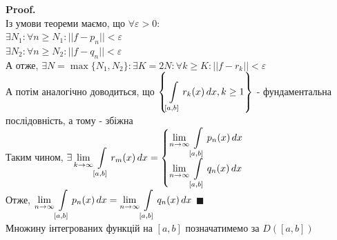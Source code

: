 \documentclass[a4paper, 14pt]{extarticle}
\def\huge{\displaystyle}
\def\bigline{\vspace{5mm}\\}
\theoremstyle{theoremdd}
\theoremstyle{theoremdd}
\theoremstyle{theoremdd}
\theoremstyle{theoremdd}
\theoremstyle{theoremdd}
\theoremstyle{theoremdd}
\theoremstyle{theoremdd}
\theoremstyle{theoremdd}
\newenvironment{pf}{\vspace*{-3mm} \textbf{Proof. \\}}{$\blacksquare$}
\begin{document}
\begin{pf}
Із умови теореми маємо, що $\forall \varepsilon > 0:$\\
$\exists N_1: \forall n \geq N_1: ||f-p_n|| < \varepsilon$ \\
$\exists N_2: \forall n \geq N_2: ||f - q_n|| < \varepsilon$\\
А отже, $\exists N = \max\{N_1,N_2\}: \exists K = 2N: \forall k \geq K: ||f-r_k|| < \varepsilon$\\
А потім аналогічно доводиться, що $\left\{ \huge \int\displaylimits_{[a,b]} r_k(x)\,dx , k \geq 1 \right\}$ - фундаментальна послідовність, а тому - збіжна\\
Таким чином, $\exists \huge \lim_{k \to \infty} \int\displaylimits_{[a,b]} r_m(x)\,dx = \begin{cases} \huge \lim_{n \to \infty} \int\displaylimits_{[a,b]} p_n(x)\,dx \\ \huge \lim_{n \to \infty} \int\displaylimits_{[a,b]} q_n(x)\,dx \end{cases}$\\
Отже, $\huge \lim_{n \to \infty} \int\displaylimits_{[a,b]} p_n(x)\,dx = \huge \lim_{n \to \infty} \int\displaylimits_{[a,b]} q_n(x)\,dx$
\end{pf}
\bigline
Множину інтегрованих функцій на $[a,b]$ позначатимемо за $D([a,b])$
\end{document}
